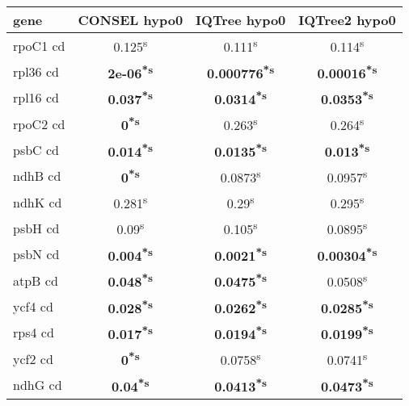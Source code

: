 \documentclass[a4paper]{article}
\begin{document}
\footnotesize
{}
\begin{longtable}{l|c|c|c}
﻿gene&CONSEL hypo0&IQTree hypo0&IQTree2 hypo0\\
\hline
\endhead
rpoC1 cd&0.125\textsuperscript{s}&0.111\textsuperscript{s}&0.114\textsuperscript{s}\\
rpl36 cd&\textbf{2e-06\textsuperscript{*}\textsuperscript{s}}&\textbf{0.000776\textsuperscript{*}\textsuperscript{s}}&\textbf{0.00016\textsuperscript{*}\textsuperscript{s}}\\
rpl16 cd&\textbf{0.037\textsuperscript{*}\textsuperscript{s}}&\textbf{0.0314\textsuperscript{*}\textsuperscript{s}}&\textbf{0.0353\textsuperscript{*}\textsuperscript{s}}\\
rpoC2 cd&\textbf{0\textsuperscript{*}\textsuperscript{s}}&0.263\textsuperscript{s}&0.264\textsuperscript{s}\\
psbC cd&\textbf{0.014\textsuperscript{*}\textsuperscript{s}}&\textbf{0.0135\textsuperscript{*}\textsuperscript{s}}&\textbf{0.013\textsuperscript{*}\textsuperscript{s}}\\
ndhB cd&\textbf{0\textsuperscript{*}\textsuperscript{s}}&0.0873\textsuperscript{s}&0.0957\textsuperscript{s}\\
ndhK cd&0.281\textsuperscript{s}&0.29\textsuperscript{s}&0.295\textsuperscript{s}\\
psbH cd&0.09\textsuperscript{s}&0.105\textsuperscript{s}&0.0895\textsuperscript{s}\\
psbN cd&\textbf{0.004\textsuperscript{*}\textsuperscript{s}}&\textbf{0.0021\textsuperscript{*}\textsuperscript{s}}&\textbf{0.00304\textsuperscript{*}\textsuperscript{s}}\\
atpB cd&\textbf{0.048\textsuperscript{*}\textsuperscript{s}}&\textbf{0.0475\textsuperscript{*}\textsuperscript{s}}&0.0508\textsuperscript{s}\\
ycf4 cd&\textbf{0.028\textsuperscript{*}\textsuperscript{s}}&\textbf{0.0262\textsuperscript{*}\textsuperscript{s}}&\textbf{0.0285\textsuperscript{*}\textsuperscript{s}}\\
rps4 cd&\textbf{0.017\textsuperscript{*}\textsuperscript{s}}&\textbf{0.0194\textsuperscript{*}\textsuperscript{s}}&\textbf{0.0199\textsuperscript{*}\textsuperscript{s}}\\
ycf2 cd&\textbf{0\textsuperscript{*}\textsuperscript{s}}&0.0758\textsuperscript{s}&0.0741\textsuperscript{s}\\
ndhG cd&\textbf{0.04\textsuperscript{*}\textsuperscript{s}}&\textbf{0.0413\textsuperscript{*}\textsuperscript{s}}&\textbf{0.0473\textsuperscript{*}\textsuperscript{s}}\\

\end{longtable}
\end{document}
